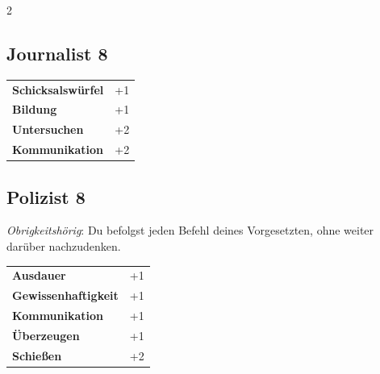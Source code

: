 \begin{multicols}{2}
\begin{tcolorbox}

\end{tcolorbox}

\begin{tcolorbox}
    \subsection*{Journalist \hfill \small{8 }}
    \tcblower




\begin{tabular}{@{}ll@{}}
    \textbf{Schicksalswürfel} & +1\\
    \textbf{Bildung} & +1\\
    \textbf{Untersuchen} & +2\\
    \textbf{Kommunikation} & +2\\
\end{tabular}


\end{tcolorbox}

\begin{tcolorbox}
    \subsection*{Polizist \hfill \small{8 }}
    \tcblower
\textit{Obrigkeitshörig}: Du befolgst jeden Befehl deines Vorgesetzten, ohne weiter darüber nachzudenken.


\vspace{3mm}

\begin{tabular}{@{}ll@{}}
    \textbf{Ausdauer} & +1\\
    \textbf{Gewissenhaftigkeit} & +1\\
    \textbf{Kommunikation} & +1\\
    \textbf{Überzeugen} & +1\\
    \textbf{Schießen} & +2\\
\end{tabular}


\end{tcolorbox}
\end{multicols}
